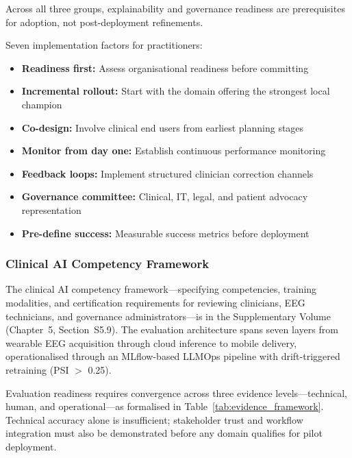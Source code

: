 \noindent Across all three groups, explainability and governance readiness are prerequisites for adoption, not post-deployment refinements.

Seven implementation factors for practitioners:
\begin{itemize}[nosep]
    \item \textbf{Readiness first:} Assess organisational readiness before committing
    \item \textbf{Incremental rollout:} Start with the domain offering the strongest local champion
    \item \textbf{Co-design:} Involve clinical end users from earliest planning stages
    \item \textbf{Monitor from day one:} Establish continuous performance monitoring
    \item \textbf{Feedback loops:} Implement structured clinician correction channels
    \item \textbf{Governance committee:} Clinical, IT, legal, and patient advocacy representation
    \item \textbf{Pre-define success:} Measurable success metrics before deployment
\end{itemize}

\subsubsection{Clinical AI Competency Framework}

The clinical AI competency framework---specifying competencies, training modalities, and certification requirements for reviewing clinicians, EEG technicians, and governance administrators---is in the Supplementary Volume (Chapter~5, Section~S5.9). The evaluation architecture spans seven layers from wearable EEG acquisition through cloud inference to mobile delivery, operationalised through an MLflow-based LLMOps pipeline with drift-triggered retraining (PSI $>$ 0.25).

\noindent Evaluation readiness requires convergence across three evidence levels---technical, human, and operational---as formalised in Table~\ref{tab:evidence_framework}. Technical accuracy alone is insufficient; stakeholder trust and workflow integration must also be demonstrated before any domain qualifies for pilot deployment.

